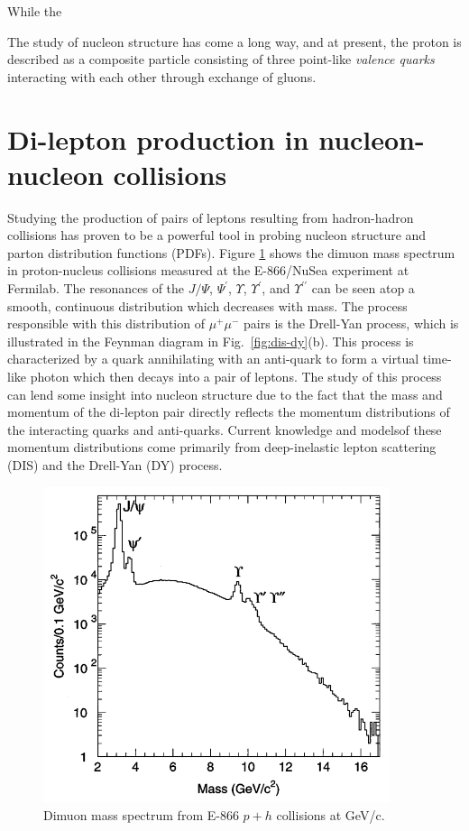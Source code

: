While the 

The study of nucleon structure has come a long way, and at present, the proton 
is described as a composite particle consisting of three point-like \emph{valence quarks}
interacting with each other through exchange of gluons.

\section{Di-lepton production in nucleon-nucleon collisions}

Studying the production of pairs of leptons resulting from hadron-hadron collisions has proven to be a powerful tool in probing nucleon structure and parton distribution functions (PDFs). Figure \ref{fig:DY-spectrum} shows the dimuon mass spectrum in proton-nucleus collisions measured at the E-866/NuSea experiment at Fermilab\cite{PhysRevLett.80.3715}. The resonances of the $J/\Psi$, $\Psi^\prime$, $\Upsilon$, $\Upsilon^\prime$, and $\Upsilon^{\prime\prime}$ can be seen atop a smooth, continuous distribution which decreases with mass. The process responsible with this distribution of $\mu^+\mu^-$ pairs is the Drell-Yan process\cite{PhysRevLett.25.316}, which is illustrated in the Feynman diagram in Fig.~\ref{fig:dis-dy}(b). This process is characterized by a quark annihilating with an anti-quark to form a virtual time-like photon which then decays into a pair of leptons. The study of this process can lend some insight into nucleon structure due to the fact that the mass and momentum of the di-lepton pair directly reflects the momentum distributions of the interacting quarks and anti-quarks. Current knowledge and models\CN of these momentum distributions come primarily from deep-inelastic lepton scattering (DIS) and the Drell-Yan (DY) process.

\begin{figure}
	\centering
	\includegraphics[width=4in]{figures/background/DY-spectrum-e866.png}
	\caption{Dimuon mass spectrum from E-866 $p+h$ collisions at \unit[800]{GeV/c}\cite{PhysRevLett.80.3715}.}
	\label{fig:DY-spectrum}
\end{figure}

